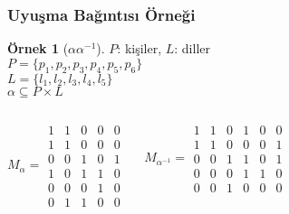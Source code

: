 \documentclass[dvipsnames]{beamer}
\theoremstyle{definition}
\theoremstyle{example}
\newtheorem{ornek}[theorem]{Örnek}
\theoremstyle{plain}
\begin{document}
\begin{frame}
  \frametitle{Uyuşma Bağıntısı Örneği}

  \begin{ornek}[$\alpha \alpha^{-1}$]
    $P$: kişiler, $L$: diller\\
    $P=\{p_1,p_2,p_3,p_4,p_5,p_6\}$\\
    $L=\{l_1,l_2,l_3,l_4,l_5\}$\\

    \medskip
    $\alpha \subseteq P \times L$

    \pause
    \begin{columns}
      \[
        M_\alpha =
          \begin{array}{|ccccc|}
            1  &  1  &  0  &  0  &  0\\
            1  &  1  &  0  &  0  &  0\\
            0  &  0  &  1  &  0  &  1\\
            1  &  0  &  1  &  1  &  0\\
            0  &  0  &  0  &  1  &  0\\
            0  &  1  &  1  &  0  &  0
          \end{array}
      \]

      \[
        M_{\alpha^{-1}} =
          \begin{array}{|cccccc|}
            1  &  1  &  0  &  1  &  0  &  0\\
            1  &  1  &  0  &  0  &  0  &  1\\
            0  &  0  &  1  &  1  &  0  &  1\\
            0  &  0  &  0  &  1  &  1  &  0\\
            0  &  0  &  1  &  0  &  0  &  0
          \end{array}
      \]
    \end{columns}
  \end{ornek}
\end{frame}
\end{document}
